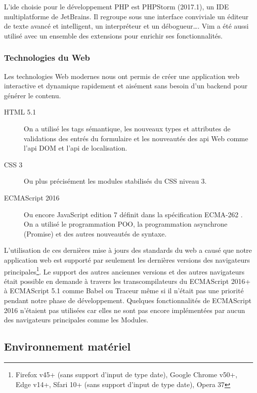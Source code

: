L'ide choisie pour le développement PHP est PHPStorm (2017.1),
un IDE multiplatforme de JetBrains. Il regroupe sous une interface conviviale
un éditeur de texte avancé et intelligent, un interpréteur et un
débogueur\ldots. Vim a été aussi utilisé avec un ensemble des extensions pour
enrichir ses fonctionnalités.

\subsubsection{Technologies du Web}

Les technologies Web modernes nous ont permis de créer une application web
interactive et dynamique rapidement et aisément sans besoin d'un backend pour
générer le contenu.

\begin{description}
    \item [HTML 5.1] On a utilisé les tags sémantique, les nouveaux types et
        attributes de validations des entrés du formulaire et les nouveautés
        des api Web comme l'api DOM et l'api de localisation.
    \item [CSS 3] Ou plus précisément les modules stabilisés du CSS niveau 3.
    \item [ECMAScript 2016\textregistered] Ou encore JavaScript edition 7
        définit dans la spécification ECMA-262 \cite{ECMA262}. On a utilisé le
        programmation POO, la programmation asynchrone (Promise) et des autres
        nouveautés de syntaxe.
\end{description}

L'utilisation de ces dernières mise à jours des standards du web a causé que
notre application web est supporté par seulement les dernières versions des
navigateurs principales\footnote{Firefox v45+ (sans support d'input de type
date), Google Chrome v50+, Edge v14+, Sfari 10+ (sans support d'input de type
date), Opera 37}. Le support des autres anciennes versions et des autres
navigateurs était possible en demande à travers les transcompilateurs du
ECMAScript 2016+ à ECMAScript 5.1 comme Babel ou Traceur même si il n'était pas
une priorité pendant notre phase de développement. Quelques fonctionnalités de
ECMAScript 2016 n'étaient pas utilisées car elles ne sont pas encore
implémentées par aucun des navigateurs principales comme les Modules.

\subsection{Environnement matériel}

